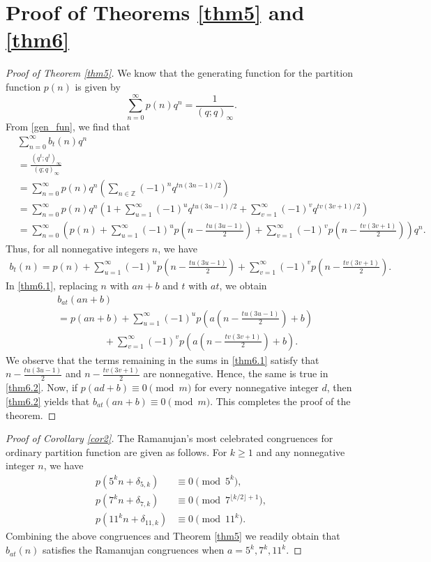 \documentclass[reqno]{amsart}
\theoremstyle{definition}
\theoremstyle{remark}
\numberwithin{equation}{section}
\begin{document}
\section{Proof of Theorems \ref{thm5} and \ref{thm6}}
\begin{proof}[Proof of Theorem \ref{thm5}]
	We know that the generating function for the partition function $p(n)$ is given by
	$$\sum_{n=0}^{\infty}p(n)q^n=\frac{1}{(q;q)_{\infty}}.$$
	From \eqref{gen_fun}, we find that
	\begin{align}
	&\sum_{n=0}^{\infty}b_{t}(n)q^n\nonumber \\
	&=\frac{(q^{t};q^{t})_{\infty}}{(q;q)_{\infty}}\nonumber\\
	&=\sum_{n=0}^{\infty}p(n)q^{n}\left(\sum_{n\in \mathbb{Z}}(-1)^{n}q^{t n(3n-1)/2} \right)\nonumber\\
	&=\sum_{n=0}^{\infty}p(n)q^{n}\left(1+\sum_{u=1}^{\infty}(-1)^{u}q^{t u(3u-1)/2}+\sum_{v=1}^{\infty}(-1)^{v}q^{t v(3v+1)/2}\right)\nonumber\\
	&=\sum_{n=0}^{\infty}\left( p(n)+\sum_{u=1}^{\infty}(-1)^{u}p\left(n-\frac{t u(3u-1)}{2} \right) +\sum_{v=1}^{\infty}(-1)^{v}p\left(n-\frac{t v(3v+1)}{2} \right)\right) q^{n}.
	\end{align}
	Thus, for all nonnegative integers $n$, we have
	\begin{align}\label{thm6.1}
	b_{t}(n)=p(n)+\sum_{u=1}^{\infty}(-1)^{u}p\left(n-\frac{t u(3u-1)}{2} \right) +\sum_{v=1}^{\infty}(-1)^{v}p\left(n-\frac{t v(3v+1)}{2} \right).
	\end{align}
	In \eqref{thm6.1}, replacing $n$ with $an+b$ and $t$ with $at$, we obtain
	\begin{align}\label{thm6.2}
	&b_{at}(an+b)\nonumber\\
	&=p(an+b)+\sum_{u=1}^{\infty}(-1)^{u}p\left(a\left(n-\frac{tu(3u-1)}{2}\right)+b \right)\nonumber\\ &\hspace{2cm}+\sum_{v=1}^{\infty}(-1)^{v}p\left(a\left(n-\frac{tv(3v+1)}{2}\right) +b \right).
	\end{align}
	We observe that the terms remaining in the sums in \eqref{thm6.1} satisfy that $n-\frac{t u(3u-1)}{2}$ and $n-\frac{t v(3v+1)}{2}$ are nonnegative. Hence, the same is true in \eqref{thm6.2}. Now, if $p(ad +b )\equiv 0 \pmod m$ for every
	nonnegative integer $d$, then \eqref{thm6.2} yields that $b_{at}(an + b)\equiv 0 \pmod m$. This completes the proof of the theorem.
\end{proof}
\begin{proof}[Proof of Corollary \ref{cor2}]
	The Ramanujan's most celebrated congruences for ordinary partition function are given as follows. For $k\geq1$ and any nonnegative integer $n$, we have
	\begin{align*}
	p\left( 5^{k}n+\delta_{5,k}\right) & \equiv0 \pmod{5^{k}},\\
	p\left(7^{k}n+\delta_{7,k}\right)&\equiv0\pmod{7^{\lfloor k/2\rfloor+1}} ,\\
	p\left(11^{k}n+\delta_{11,k}\right)&\equiv0\pmod{11^{k}}.
	\end{align*}
	Combining the above congruences and Theorem \ref{thm5} we readily obtain that
	$b_{at}(n)$ satisfies the Ramanujan congruences when $a = 5^k, 7^k, 11^k$.	
\end{proof}
\end{document}

